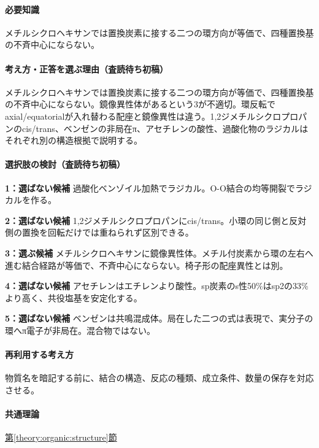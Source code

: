 \paragraph{必要知識} メチルシクロヘキサンでは置換炭素に接する二つの環方向が等価で、四種置換基の不斉中心にならない。

\paragraph{考え方・正答を選ぶ理由（査読待ち初稿）} メチルシクロヘキサンでは置換炭素に接する二つの環方向が等価で、四種置換基の不斉中心にならない。鏡像異性体があるという3が不適切。環反転でaxial/equatorialが入れ替わる配座と鏡像異性は違う。1,2ジメチルシクロプロパンのcis/trans、ベンゼンの非局在π、アセチレンの酸性、過酸化物のラジカルはそれぞれ別の構造根拠で説明する。

\paragraph{選択肢の検討（査読待ち初稿）}\mbox{}\par

\noindent\textbf{1：選ばない候補} 過酸化ベンゾイル加熱でラジカル。O-O結合の均等開裂でラジカルを作る。\par

\noindent\textbf{2：選ばない候補} 1,2ジメチルシクロプロパンにcis/trans。小環の同じ側と反対側の置換を回転だけでは重ねられず区別できる。\par

\noindent\textbf{3：選ぶ候補} メチルシクロヘキサンに鏡像異性体。メチル付炭素から環の左右へ進む結合経路が等価で、不斉中心にならない。椅子形の配座異性とは別。\par

\noindent\textbf{4：選ばない候補} アセチレンはエチレンより酸性。sp炭素のs性50\%はsp2の33\%より高く、共役塩基を安定化する。\par

\noindent\textbf{5：選ばない候補} ベンゼンは共鳴混成体。局在した二つの式は表現で、実分子の環へπ電子が非局在。混合物ではない。\par

\paragraph{再利用する考え方} 物質名を暗記する前に、結合の構造、反応の種類、成立条件、数量の保存を対応させる。

\paragraph{共通理論} \hyperref[theory:organic:structure]{第\ref*{theory:organic:structure}節}

